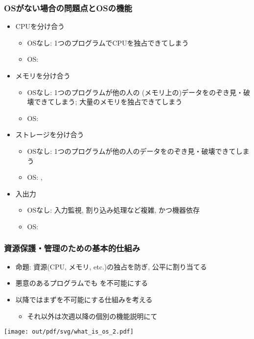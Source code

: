 \documentclass[12pt,dvipdfmx]{beamer}
\begin{document}
\begin{frame}
\frametitle{OSがない場合の問題点とOSの機能}
\begin{itemize}
\item CPUを分け合う
  \begin{itemize}
  \item OSなし: 1つのプログラムでCPUを独占できてしまう
  \item OS: 
  \end{itemize}
\item メモリを分け合う
  \begin{itemize}
  \item OSなし: 1つのプログラムが他の人の
    (メモリ上の)データをのぞき見・破壊できてしまう;
    大量のメモリを独占できてしまう
  \item OS: 
  \end{itemize}
\item ストレージを分け合う
  \begin{itemize}
  \item OSなし: 1つのプログラムが他の人のデータをのぞき見・破壊できてしまう
  \item OS: , 
  \end{itemize}
\item 入出力
  \begin{itemize}
  \item OSなし: 入力監視, 割り込み処理など複雑, かつ機器依存
  \item OS: 
  \end{itemize}
\end{itemize}
\end{frame}


\begin{frame}
  \frametitle{資源保護・管理のための基本的仕組み}
  \begin{itemize}
  \item 命題: 資源(CPU, メモリ, etc.)の独占を防ぎ, 公平に割り当てる
  \item 悪意のあるプログラムでも
    を不可能にする
  \item 以降ではまずを不可能にする仕組みを考える
    \begin{itemize}
    \item それ以外は次週以降の個別の機能説明にて
    \end{itemize}
  \end{itemize}

  \begin{center}
    \texttt{[image: out/pdf/svg/what\_is\_os\_2.pdf]}
  \end{center}
\end{frame}
\end{document}
